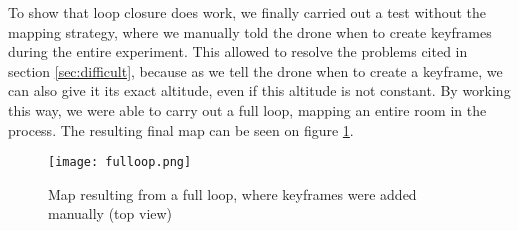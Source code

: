To show that loop closure does work, we finally carried out a test without the mapping strategy, where we manually told the drone when to create keyframes during the entire experiment. This allowed to resolve the problems cited in section \ref{sec:difficult}, because as we tell the drone when to create a keyframe, we can also give it its exact altitude, even if this altitude is not constant. By working this way, we were able to carry out a full loop, mapping an entire room in the process. The resulting final map can be seen on figure \ref{fig:fulloop}.\\

\begin{figure}[H]
  \centering
  \texttt{[image: fulloop.png]}
\caption{Map resulting from a full loop, where keyframes were added manually (top view)}
\label{fig:fulloop}
\end{figure}
